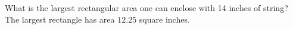 {What is the largest rectangular area one can enclose with 14 inches of string?}
{The largest rectangle has area $12.25$ square inches.}